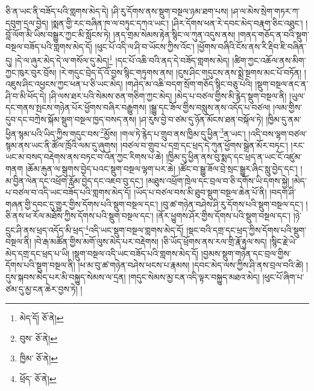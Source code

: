 ཅི་ན་ཡང་ནི་བཟོད་པའི་གླགས་མེད་དེ། །ཤི་རུ་དོགས་ནས་སྡུག་བསྔལ་ཉམ་ཐག་པས། །ཤ་ལ་མེས་སྲེག་གཏར་ཀ་དབུག་དྲལ་བྱེད། །སྨན་གྱི་རང་བཞིན་ཁ་ལ་བཏུང་དཀའ་ཡང་། །ཤིར་དོགས་ཕན་རེ་དབང་མེད་བརྣག་ཅིང་འཐུང་། །བློ་ལོག་མི་ཡིས་བསྒྱུར་ཀྱང་མི་སློངས་ཏེ། །ནད་གྲམ་སེམས་རྟེན་སྙིང་ལ་ཀུན་འདུས་ནས། །གནད་གཅོད་ན་བའི་སྡུག་བསྔལ་བཟོད་པའི་གླགས་མེད་དོ། །ཕུང་པོ་འདི་ལ་ཤི་བ་ཡོངས་ཀྱིས་འོང་། །ཕྱོགས་བཞིའི་ངོས་ནས་རི་རྡིབ་ཇི་བཞིན་དུ། །དེ་ལ་ཞུར་མེད་དེ་ལ་གསོལ་དུ་མེད།\footnote{མེད་དོ།  ཅོ་ནེ། } །དང་པོ་འཆི་བའི་ནད་དེ་བཟོད་གླགས་མེད། །ཚིག་ཀྱང་འཆོལ་ནས་མིག་ཀྱང་ཁུར་བུར་བྲོས། །རེ་གདུང་བྲེད་དོ་འོ་བྱས་སྙིང་གཏུགས་ནས། །ངུས་ཤིང་གདུངས་ནས་སྨྲེ་སྔགས་མང་པོ་བཏོན། །འཇུས་ཤིང་འཕྱངས་ཀྱང་ཕན་པ་ཅི་ཡང་མེད། །གཤེད་མ་འཆི་བདག་སྲོག་གཅོད་སྙིང་བཅུ་པའི། །སྡུག་བསྔལ་ནང་ན་ཤི་བ་མི་ཕོད་དེ། །ཤི་ལས་ཐར་པའི་སེམས་ཅན་གཅིག་ཀྱང་མེད། །མེད་པ་བཙལ་གྱིས་མི་རྙེད་སྡུག་བསྔལ་ནི། །ཡུལ་དང་གནས་སྤངས་གཉེན་པོར་ཕྱོགས་བཞིར་བརྒྱུགས། །སྒྱུ་དང་ཟོལ་གྱིས་བསླུས་ནས་འདོད་པ་བཙལ། །ལམ་གྱིས་དུབ་དང་བཀྲེས་སྐོམ་སྡུག་བསྔལ་ཁྱད་བསད་ནས། །ཤ་རུས་བྱེ་བ་ཙམ་དུ་ཉོན་མོངས་ཐན་བསྐོལ་ཏེ། །ཁྱིམ་དུ་ནམ་ཕྱིན་སྙམ་པའི་ཡིད་ཀྱིས་གདུང་བས་\footnote{བུས་  ཅོ་ནེ། }མྱོས། །གལ་ཏེ་རྙེད་པ་གྲུབ་ནས་ཁྱིམ་དུ་ཕྱིན་\footnote{ཁྱིམ་  ཅོ་ནེ། }ན་ཡང་། །འདི་བས་ལྷག་བཙལ་སྙམ་ནས་ཡང་ནི་ཚོལ་ཁྲོའི་ལམ་དུ་ཞུགས། །བཙལ་བ་གྲུབ་པ་དགྲ་དང་ཕྲད་དེ་ཀུན་ཕྱོགས་སྒྲེན་མོར་བཏང་། །རང་ཡང་མ་བསད་བརྡེགས་ནས་བཏང་བ་འོན་ཀྱང་རིགས་པ་ཆེ། །ཁྱིམ་དུ་ཕྱིན་ནས་བུ་སྨད་དང་ཕྲད་ན་ཡང་ངོ་འཛུམ་གནག །ཆོམ་རྐུན་ལ་སྒུགས་བྱེད་པའང་སྡུག་བསྔལ་ལྷག་པར་ཆེ། །ཚོང་བ་སྒྱུ་ཟོལ་བྲེ་སྲང་སྒྱུར་ཞིང་སླུ་བྱེད་དང་། །མ་བྱིན་ལེན་དང་འཕྲོག་རློམ་བྱེད་དང་འཇབ་བུ་དང་། །མཐུས་འཕྲོག་ཁྲེལ་དང་བྲལ་བ་ཅི་དགོས་ཡི་དགས་སྐྱེ། །མེད་པ་བཙལ་བ་འདི་ཡང་བཟོད་པའི་གླགས་མེད་དོ། །ཡོད་པ་བཙལ་བས་མི་ཐུབ་སྡུག་བསྔལ་ཆེན་པོ་ནི། །བདག་ཤི་གཞན་གྱི་དབང་དུ་གྱུར་གྱིས་དོགས་པའི་སྡུག་བསྔལ་དང་། །བུ་ཚ་གཉེན་བཤེས་ཤི་རུ་དོགས་པའི་སྡུག་བསྔལ་དང་། །ཅི་ནས་ཕ་རོལ་མཐོས་ཀྱིས་དོགས་པའི་སྡུག་བསྔལ་དང་། །ནོར་ཕྱུགས་ཤོར་གྱིས་དོགས་པའི་སྡུག་བསྔལ་དང་། །ཉེ་དྲུང་ཤི་ནས་ཕྲད་འདོད་མི་ཕྲད་\footnote{ཕྲོད་  ཅོ་ནེ། }འདི་ཡང་སྡུག་བསྔལ་གླགས་མེད་དོ། །སྡང་བའི་དགྲ་དང་ཕྲད་ཀྱིས་དོགས་པའི་སྡུག་བསྔལ་ནི། །བེ་རྒ་མཚོན་གྱིས་མགོ་ལུས་མེད་པར་བརྡེགས། །ཅི་ཡོད་ཕྲོགས་ནས་རལ་གྲི་རྣོ་རྟུལ་སད། །སྙིང་རྗེ་ཡེ་མེད་དགྲ་དང་ཕྲད་པ་ཡི། །སྡུག་བསྔལ་འདི་ཡང་བཟོད་པའི་གླགས་མེད་དོ། །བྱམས་སྡུག་གཉེན་དང་བྲལ་གྱིས་དོགས་པའི་སྡུག་བསྔལ་ནི། །ཕ་མ་བུ་ཚ་གཉེན་བཤེས་ཕངས་པ་རྣམས། །དབང་མེད་ལས་ཀྱིས་ཤི་ནས་བྲལ་བའི་ཚེ། །དུས་སྐབས་མེད་པར་མི་བསྐྱུད་སེམས་ལ་དྲན། །གདུང་སེམས་མྱ་ངན་འདི་ལྟར་བསྐྱུད་མཐའ་མེད། །ཕུང་པོ་ཞིག་པ་ཙམ་དུ་མྱ་ངན་ཆེར་བྱས་ཏེ། །
